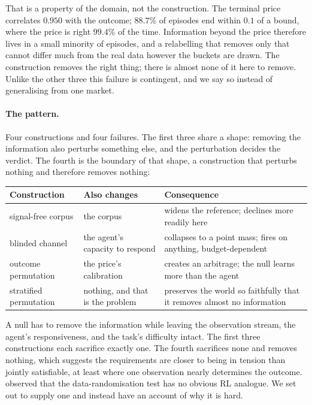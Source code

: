 \documentclass[10pt,twocolumn]{article}
\begin{document}
That is a property of the domain, not the construction. The terminal price
correlates $0.950$ with the outcome; $88.7\%$ of episodes end within $0.1$ of a
bound, where the price is right $99.4\%$ of the time. Information beyond the
price therefore lives in a small minority of episodes, and a relabelling that
removes only that cannot differ much from the real data however the buckets are
drawn. The construction removes the right thing; there is almost none of it here
to remove. Unlike the other three this failure is contingent, and we say so
instead of generalising from one market.

\paragraph{The pattern.}
Four constructions and four failures. The first three share a shape: removing
the information also perturbs something else, and the perturbation decides the
verdict. The fourth is the boundary of that shape, a construction that perturbs
nothing and therefore removes nothing:

\begin{center}\footnotesize
\begin{tabular}{p{}p{}p{}}
\toprule
Construction & Also changes & Consequence \\
\midrule
signal-free corpus & the corpus & widens the reference; declines more readily here \\
\addlinespace
blinded channel & the agent's capacity to respond & collapses to a point mass;
fires on anything, budget-dependent \\
\addlinespace
outcome permutation & the price's calibration & creates an arbitrage; the null
learns more than the agent \\
\addlinespace
stratified permutation & nothing, and that is the problem & preserves the world
so faithfully that it removes almost no information \\
\bottomrule
\end{tabular}
\end{center}

A null has to remove the information while leaving the observation stream, the
agent's responsiveness, and the task's difficulty intact. The first three
constructions each sacrifice exactly one. The fourth sacrifices none and removes
nothing, which suggests the requirements are closer to being in tension than
jointly satisfiable, at least where one observation nearly determines the
outcome. \citet{huber2022benchmarking} observed that the data-randomisation test
has no obvious RL analogue. We set out to supply one and instead have an account
of why it is hard.
\end{document}
